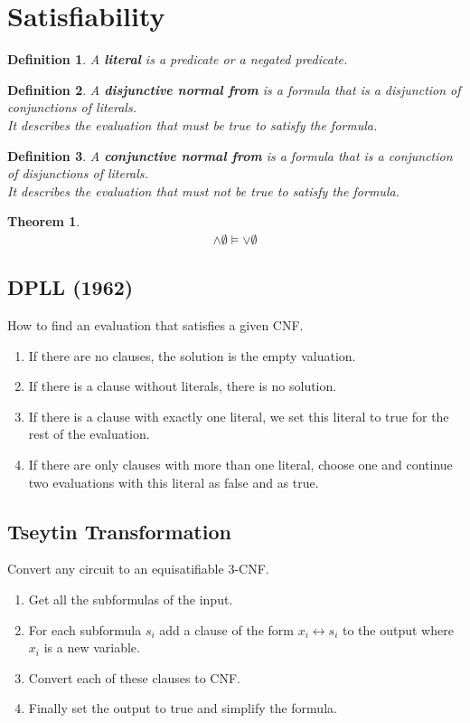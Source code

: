 \documentclass{article}
\theoremstyle{sltheorem}
\newtheorem{definition}{Definition}
\newtheorem{theorem}{Theorem}
\begin{document}
\section{Satisfiability}
\begin{definition}
    A \textbf{literal} is a predicate or a negated predicate.
\end{definition}
\begin{definition}
    A \textbf{disjunctive normal from} is a formula that is a disjunction of conjunctions of literals.\\
    It describes the evaluation that must be true to satisfy the formula.
\end{definition}
\begin{definition}
    A \textbf{conjunctive normal from} is a formula that is a conjunction of disjunctions of literals.\\
    It describes the evaluation that must not be true to satisfy the formula.
\end{definition}
\begin{theorem}
    \begin{gather*}
        \wedge \emptyset\vDash\vee\emptyset
    \end{gather*}
\end{theorem}
\subsection{DPLL (1962)}
How to find an evaluation that satisfies a given CNF.
\begin{enumerate}
    \item If there are no clauses, the solution is the empty valuation.
    \item If there is a clause without literals, there is no solution.
    \item If there is a clause with exactly one literal, we set this literal to true for the rest of the evaluation.
    \item If there are only clauses with more than one literal, choose one and continue two evaluations with this literal as false and as true.
\end{enumerate}
\subsection{Tseytin Transformation}
Convert any circuit to an equisatifiable 3-CNF.
\begin{enumerate}
    \item Get all the subformulas of the input.
    \item For each subformula $s_i$ add a clause of the form $x_i \leftrightarrow s_i$ to the output where $x_i$ is a new variable.
    \item Convert each of these clauses to CNF.
    \item Finally set the output to true and simplify the formula.
\end{enumerate}
\end{document}
